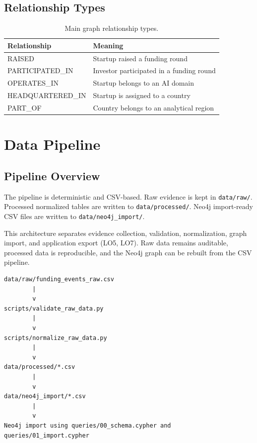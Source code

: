 \documentclass[11pt,a4paper]{article}
\begin{document}
\subsection{Relationship Types}

\begin{table}[H]
\centering
\begin{tabular}{ll}
\toprule
Relationship & Meaning \\
\midrule
RAISED & Startup raised a funding round \\
PARTICIPATED\_IN & Investor participated in a funding round \\
OPERATES\_IN & Startup belongs to an AI domain \\
HEADQUARTERED\_IN & Startup is assigned to a country \\
PART\_OF & Country belongs to an analytical region \\
\bottomrule
\end{tabular}
\caption{Main graph relationship types.}
\end{table}

\section{Data Pipeline}
\label{sec:pipeline}

\subsection{Pipeline Overview}

The pipeline is deterministic and CSV-based. Raw evidence is kept in
\texttt{data/raw/}. Processed normalized tables are written to
\texttt{data/processed/}. Neo4j import-ready CSV files are written to
\texttt{data/neo4j\_import/}.

This architecture separates evidence collection, validation, normalization,
graph import, and application export (LO5, LO7). Raw data remains auditable,
processed data is reproducible, and the Neo4j graph can be rebuilt from the
CSV pipeline.

\begin{lstlisting}[language={}]
data/raw/funding_events_raw.csv
        |
        v
scripts/validate_raw_data.py
        |
        v
scripts/normalize_raw_data.py
        |
        v
data/processed/*.csv
        |
        v
data/neo4j_import/*.csv
        |
        v
Neo4j import using queries/00_schema.cypher and queries/01_import.cypher
\end{lstlisting}
\end{document}
